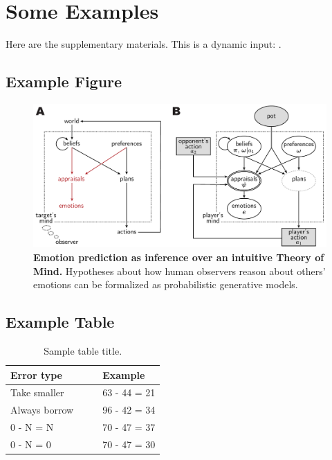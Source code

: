 \section*{} \label{sec:supplement}

\section{Some Examples}

Here are the supplementary materials. This is a dynamic input: $$.

\subsection{Example Figure}

\begin{figure}[h!]
	\centering
	\includegraphics[width=1\textwidth,keepaspectratio]{figs/model_diagram.pdf}
	\caption{\textbf{Emotion prediction as inference over an intuitive Theory of Mind.} 
	Hypotheses about how human observers reason about others' emotions can be formalized as probabilistic generative models.
	}
	\label{fig:supp:dag}
\end{figure}

\subsection{Example Table}

\begin{table}[h!]
\begin{center} 
\caption{Sample table title.} 
\label{sample-table} 
\vskip 0.12in
\begin{tabular}{ll} 
\hline
Error type    &  Example \\
\hline
Take smaller        &   63 - 44 = 21 \\
Always borrow~~~~   &   96 - 42 = 34 \\
0 - N = N           &   70 - 47 = 37 \\
0 - N = 0           &   70 - 47 = 30 \\
\hline
\end{tabular} 
\end{center} 
\end{table}
